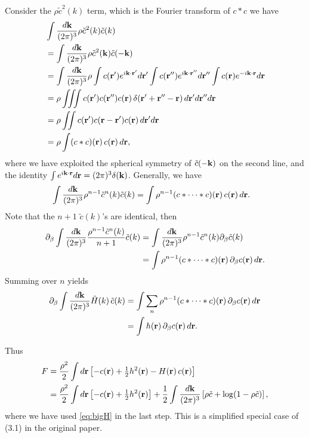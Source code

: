 \documentclass[12pt]{article}
\begin{document}
Consider the $\rho \tilde{c}^2(k)$ term,
  which is the Fourier transform of $c*c$
we have
\begin{align*}
  &  \int
    \frac{d \mathbf{k}}{(2\pi)^3}
  \rho \tilde{c}^2(k) \tilde{c}(k) \\
&=  \int
    \frac{d \mathbf{k}}{(2\pi)^3}
  \rho \tilde{c}^2(\mathbf{k}) \tilde{c}(-\mathbf{k}) \\
&=
  \int
    \frac{d \mathbf{k}}{(2\pi)^3}
    \rho
    \int c(\mathbf{r}')  e^{ i \mathbf{k}\cdot \mathbf{r}'}   d \mathbf{r}'
    \int c(\mathbf{r}'') e^{ i \mathbf{k}\cdot \mathbf{r}''}  d \mathbf{r}''
    \int c(\mathbf{r})   e^{-i \mathbf{k}\cdot \mathbf{r}}    d \mathbf{r} \\
&=
    \rho
    \iiint
    c(\mathbf{r}')  c(\mathbf{r}'') c(\mathbf{r})
    \, \delta(\mathbf{r}' + \mathbf{r}'' - \mathbf{r}) \,
    d \mathbf{r}'
    d \mathbf{r}''
    d \mathbf{r} \\
&=
    \rho
    \iint
    c(\mathbf{r}')  c(\mathbf{r} - \mathbf{r}') c(\mathbf{r}) \,
    d \mathbf{r}'
    d \mathbf{r} \\
&= \rho \int (c*c)(\mathbf{r}) \, c(\mathbf{r}) \,
    d \mathbf{r},
\end{align*}
where we have exploited the spherical symmetry of $\tilde{c}(-\mathbf{k})$
on the second line, and the identity
$\int e^{i \mathbf{k}\cdot \mathbf{r}} d \mathbf{r} = (2\pi)^3 \delta(\mathbf{k})$.
%
Generally, we have
%
\begin{align*}
  & \int
    \frac{d \mathbf{k}}{(2\pi)^3}
    \rho^{n-1} \tilde{c}^n(k)
     \tilde{c}(k)
  = \int \rho^{n-1} (c*\dots*c)(\mathbf{r}) \, c(\mathbf{r}) \,
    d \mathbf{r}.
\end{align*}
%
Note that the $n + 1$ $\tilde{c}(k)$'s are identical, then
%
\begin{align*}
  \partial_\beta  \int
    \frac{d \mathbf{k}}{(2\pi)^3}
  \frac{\rho^{n-1} \tilde{c}^n(k) }{n+1} \tilde{c}(k)
  &= \int
    \frac{d \mathbf{k}}{(2\pi)^3}
  \rho^{n-1} \tilde{c}^n(k) \partial_\beta \tilde{c}(k) \\
  &=  \int \rho^{n-1} (c*\dots*c)(\mathbf{r}) \, \partial_\beta c(\mathbf{r}) \,
    d \mathbf{r}.
\end{align*}
%
Summing over $n$ yields
%
\begin{align*}
  \partial_\beta  \int
    \frac{d \mathbf{k}}{(2\pi)^3}
    \tilde{H}(k) \, \tilde{c}(k)
&= \int \sum_{n} \rho^{n-1}(c*\dots*c)(\mathbf{r}) \, \partial_\beta c(\mathbf{r}) \,
    d \mathbf{r} \\
&= \int h(\mathbf{r}) \, \partial_\beta c(\mathbf{r}) \,
    d \mathbf{r}.
\end{align*}
%
%

Thus
%
\begin{align*}
F
&=
  \frac{\rho^2}{2}
  \int d\mathbf{r}
  \left[
    - c(\mathbf{r})
    + \tfrac{1}{2} h^2(\mathbf{r})
    - H(\mathbf{r}) \, c(\mathbf{r})
  \right] \\
  &=
  \frac{\rho^2}{2}
  \int d\mathbf{r}
  \left[
    - c(\mathbf{r})
    + \tfrac{1}{2} h^2(\mathbf{r})
  \right]
  +
   \frac{1}{2}
  \int \frac{ d \mathbf{k}  }{(2\pi)^3}
   \left[
      \rho \tilde{c} + \log(1 - \rho \tilde{c})
      \right],
  \label{eq:freeEnergy}
\end{align*}
%
where we have used \eqref{eq:bigH} in the last step.
%
This is a simplified special case of (3.1) in the original paper.
\end{document}
